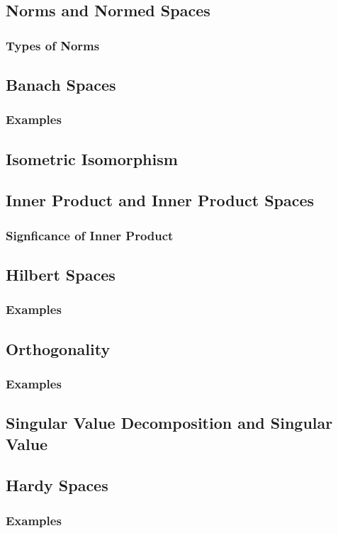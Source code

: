 \documentclass[a4paper,12pt]{article}
\begin{document}
	\subsection{Norms and Normed Spaces}
		\subsubsection{Types of Norms}
	\subsection{Banach Spaces}
		\subsubsection{Examples}
	\subsection{Isometric Isomorphism}
	\subsection{Inner Product and Inner Product Spaces}
		\subsubsection{Signficance of Inner Product}
	\subsection{Hilbert Spaces}
		\subsubsection{Examples}
	\subsection{Orthogonality}
		\subsubsection{Examples}
	\subsection{Singular Value Decomposition and Singular Value}
	\subsection{Hardy Spaces}
		\subsubsection{Examples}
\end{document}
